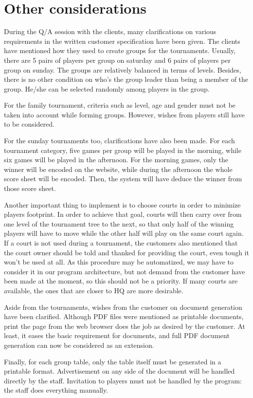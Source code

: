 \section{Other considerations}

During the Q/A session with the clients, many clarifications on various requirements in the written customer specification have been given. The clients have mentioned how they used to create groups for the tournaments. Usually, there are 5 pairs of players per group on saturday and 6 pairs of players per group on sunday. The groups are relatively balanced in terms of levels. Besides, there is no other condition on who's the group leader than being a member of the group. He/she can be selected randomly among players in the group. \newline

For the family tournament, criteria such as level, age and gender must not be taken into account while forming groups. However, wishes from players still have to be considered.\newline

For the sunday tournaments too, clarifications have also been made. For each tournament category, five games per group will be played in the morning, while six games will be played in the afternoon. For the morning games, only the winner will be encoded on the website,
while during the afternoon the whole score sheet will be encoded. Then, the system will have deduce the winner from those score sheet. \newline

Another important thing to implement is to choose courts in order to minimize players footprint. In order to achieve that goal, courts will then carry over from one level of the tournament tree to the next, so that only half of the winning players will have to move while the other half will play on the same court again.
If a court is not used during a tournament, the customers also mentioned that the court owner should be told and thanked for providing the court, even tough it won't be used at all. As this procedure may be automatized, we may have to consider it in our program architecture, but not demand from the customer have been made at the moment, so this should not be a priority.
If many courts are available, the ones that are closer to HQ are more desirable. \newline

Aside from the tournaments, wishes from the customer on document generation have been clarified. Although PDF files were mentioned as printable documents, print the page from the web browser does the job as desired by the customer. At least, it eases the basic requirement for documents, and full PDF document generation can now be considered as an extension. \newline

Finally, for each group table, only the table itself must be generated in a printable format. Advertisement on any side of the document will be handled directly by the staff. Invitation to players must not be handled by the program: the staff does everything manually.